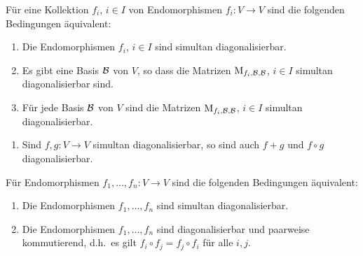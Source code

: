 \begin{lemma}
  Für eine Kollektion $f_i$, $i \in I$ von Endomorphismen $f_i \colon V \to V$ sind die folgenden Bedingungen äquivalent:
  \begin{enumerate}
    \item
      Die Endomorphismen $f_i$, $i \in I$ sind simultan diagonalisierbar.
    \item
      Es gibt eine Basis $\mathcal{B}$ von $V$, so dass die Matrizen $\operatorname{M}_{f_i, \mathcal{B}, \mathcal{B}}$, $i \in I$ simultan diagonalisierbar sind.
    \item
      Für jede Basis $\mathcal{B}$ von $V$ sind die Matrizen $\operatorname{M}_{f_i, \mathcal{B}, \mathcal{B}}$, $i \in I$ simultan diagonalisierbar.
  \end{enumerate}
\end{lemma}

\begin{example}
  \begin{enumerate}
    \item
      Sind $f, g \colon V \to V$ simultan diagonalisierbar, so sind auch $f + g$ und $f \circ g$ diagonalisierbar.
  \end{enumerate}
\end{example}

\begin{proposition}
  Für Endomorphismen $f_1, \dotsc, f_n \colon V \to V$ sind die folgenden Bedingungen äquivalent:
  \begin{enumerate}
    \item
      Die Endomorphismen $f_1, \dotsc, f_n$ sind simultan diagonalisierbar.
    \item
      Die Endomorphismen $f_1, \dotsc, f_n$ sind diagonalisierbar und paarweise kommutierend, d.h.\ es gilt $f_i \circ  f_j = f_j \circ f_i$ für alle $i, j$.
  \end{enumerate}
\end{proposition}